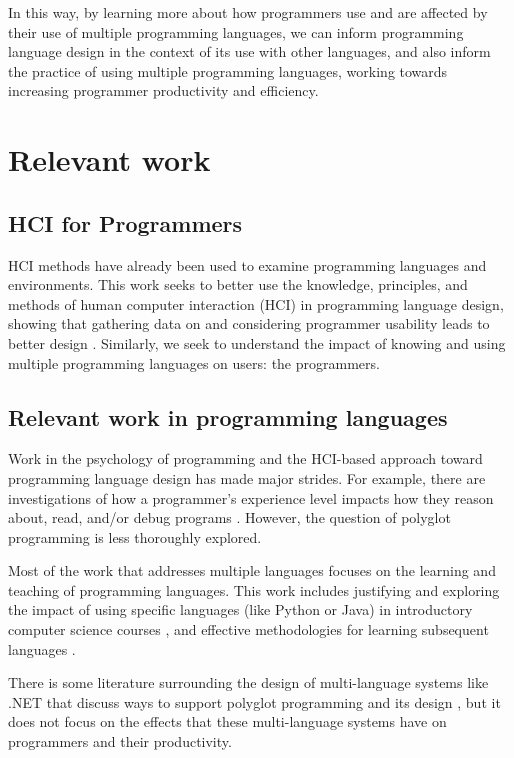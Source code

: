 \documentclass[a4paper,UKenglish,cleveref, autoref]{oasics-v2019}
\begin{document}
In this way, by learning more about how programmers use and are affected by their use of multiple programming languages, we can inform programming language design in the context of its use with other languages, and also inform the practice of using multiple programming languages, working towards increasing programmer productivity and efficiency. 

\section{Relevant work}

\subsection{HCI for Programmers}
HCI methods have already been used to examine programming languages and environments. This work seeks to better use the knowledge, principles, and methods of human computer interaction (HCI) in programming language design, showing that gathering data on and considering programmer usability leads to better design \cite{pl0017, pl0027}. Similarly, we seek to understand the impact of knowing and using multiple programming languages on users: the programmers. 

\subsection{Relevant work in programming languages}
Work in the psychology of programming and the HCI-based approach toward programming language design has made major strides. For example, there are investigations of how a programmer’s experience level impacts how they reason about, read, and/or debug programs \cite{pl0019, pl0021, pl0020}. However, the question of polyglot programming is less thoroughly explored. 

Most of the work that addresses multiple languages focuses on the learning and teaching of programming languages. This work includes justifying and exploring the impact of using specific languages (like Python or Java) in introductory computer science courses \cite{pl0024, pl0023}, and effective methodologies for learning subsequent languages \cite{pl0018, pl0022}.  

There is some literature surrounding the design of multi-language systems like .NET that discuss ways to support polyglot programming and its design \cite{pl0038}, but it does not focus on the effects that these multi-language systems have on programmers and their productivity. 
\end{document}
